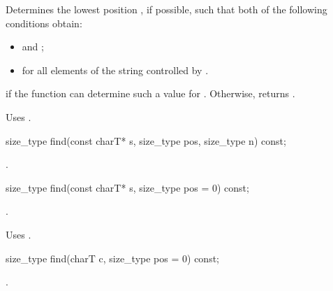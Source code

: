\begin{itemdescr}
\pnum
\effects
Determines the lowest position , if possible, such that both of
the following conditions obtain:

\begin{itemize}
\item
{} and
;
\item
{}%
for all elements  of the string controlled by .
\end{itemize}

\pnum
\returns
{} if the function can determine such a value for .
Otherwise, returns
.

\pnum
\notes
Uses
.
\end{itemdescr}

%
%
\begin{itemdecl}
size_type find(const charT* s, size_type pos, size_type n) const;
\end{itemdecl}

\begin{itemdescr}
\pnum
\returns
{}.
\end{itemdescr}

%
%
\begin{itemdecl}
size_type find(const charT* s, size_type pos = 0) const;
\end{itemdecl}

\begin{itemdescr}
\pnum
\returns
{}.

\pnum
\notes
Uses .
\end{itemdescr}

%
%
\begin{itemdecl}
size_type find(charT c, size_type pos = 0) const;
\end{itemdecl}

\begin{itemdescr}
\pnum
\returns
{}.
\end{itemdescr}

